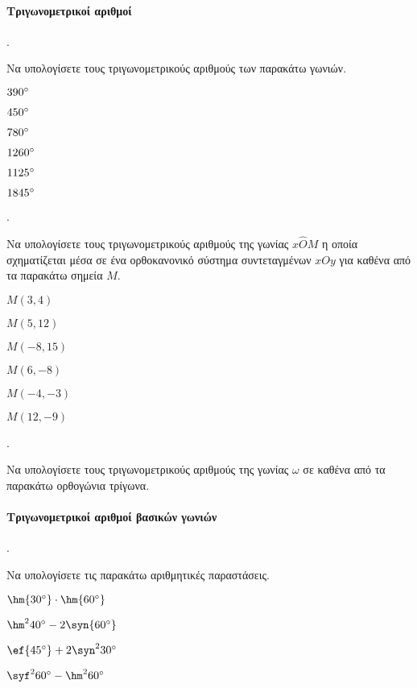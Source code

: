 \documentclass[11pt,a4paper,twocolumn]{article}
\newcounter{askhsh}
\newcommand{\askhsh}{\large\theaskhsh.\ \addtocounter{askhsh}{1}}
\begin{document}
\paragraph{Τριγωνομετρικοί αριθμοί}
\askhsh
Να υπολογίσετε τους τριγωνομετρικούς αριθμούς των παρακάτω γωνιών.
\begin{multicols}{3}
\begin{alist}
\item $ 390\degree $
\item $ 450\degree $
\item $ 780\degree $
\item $ 1260\degree $
\item $ 1125\degree $
\item $ 1845\degree $
\end{alist}
\end{multicols}
\askhsh
Να υπολογίσετε τους τριγωνομετρικούς αριθμούς της γωνίας $ x\hat{O}M $ η οποία σχηματίζεται μέσα σε ένα ορθοκανονικό σύστημα συντεταγμένων $ xOy $ για καθένα από τα παρακάτω σημεία $ M $.
\begin{multicols}{2}
\begin{alist}
\item $ M(3,4) $
\item $ M(5,12) $
\item $ M(-8,15) $
\item $ M(6,-8) $
\item $ M(-4,-3) $
\item $ M(12,-9) $
\end{alist}
\end{multicols}
\askhsh
Να υπολογίσετε τους τριγωνομετρικούς αριθμούς της γωνίας $ \omega $ σε καθένα από τα παρακάτω ορθογώνια τρίγωνα.
\paragraph{Τριγωνομετρικοί αριθμοί βασικών γωνιών}
\askhsh
Να υπολογίσετε τις παρακάτω αριθμητικές παραστάσεις.
\begin{multicols}{2}
\begin{alist}
\item $ \hm{30\degree}\cdot\hm{60\degree} $
\item $ \hm^2{40\degree}-2\syn{60\degree} $
\item $ \ef{45\degree}+2\syn^2{30\degree} $
\item $ \syf^2{60\degree}-\hm^2{60\degree} $
\end{alist}
\end{multicols}
\end{document}
